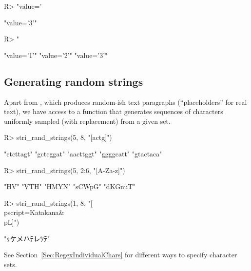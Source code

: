 \documentclass[nojss]{jss}\usepackage[]{graphicx}\usepackage[]{color}
\begin{document}
\begin{Schunk}
\begin{Sinput}
R> "value='%d'" %s$% 3              # equivalently: "value='%d'" %s$% list(3)
\end{Sinput}
\begin{Soutput}
[1] "value='3'"
\end{Soutput}
\begin{Sinput}
R> "%s='%d'"    %s$% list("value", 1:3)
\end{Sinput}
\begin{Soutput}
[1] "value='1'" "value='2'" "value='3'"
\end{Soutput}
\end{Schunk}





\subsection{Generating random strings}

Apart from ,
which produces random-ish text paragraphs (``placeholders'' for real text),
we have access to a function that generates sequences of characters
uniformly sampled (with replacement) from a given set.

\begin{Schunk}
\begin{Sinput}
R> stri_rand_strings(5, 8, "[actg]")
\end{Sinput}
\begin{Soutput}
[1] "ctcttagt" "gctcggat" "aacttggt" "ggggcatt" "gtactaca"
\end{Soutput}
\begin{Sinput}
R> stri_rand_strings(5, 2:6, "[A-Za-z]")
\end{Sinput}
\begin{Soutput}
[1] "HV"     "VTH"    "HMYN"   "sCWpG"  "dKGnuT"
\end{Soutput}
\begin{Sinput}
R> stri_rand_strings(1, 8, "[\\p{script=Katakana}&\\p{L}]")
\end{Sinput}
\begin{Soutput}
[1] "ｩケメハﾃレﾂﾃ"
\end{Soutput}
\end{Schunk}

See Section~\ref{Sec:RegexIndividualChars} for different ways
to specify character sets.
\end{document}
